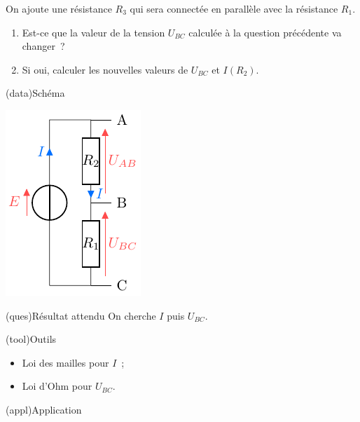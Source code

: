 \documentclass[../../main/main.tex]{subfiles}
\begin{document}
{On ajoute une résistance $R_3$ qui sera connectée en parallèle avec la
résistance $R_1$.
\begin{enumerate}[resume]
  \item Est-ce que la valeur de la tension $U_{BC}$ calculée à la question
        précédente va changer~?
  \item Si oui, calculer les nouvelles valeurs de $U_{BC}$ et $I(R_2)$.
\end{enumerate}
}{
\begin{tcbraster}[raster columns=3, raster equal height=rows]
    \begin{tcb}(data){Schéma}
        \begin{center}
            \includegraphics{divtens}
        \end{center}
    \end{tcb}
    \begin{tcolorbox}[blankest, raster multicolumn=1, space to=\myspace]
        \begin{tcbraster}[raster columns=1]
            \begin{tcb}(ques){Résultat attendu}
                On cherche $I$ puis $U_{BC}$.
            \end{tcb}
            \begin{tcb}[add to natural height=\myspace](tool){Outils}
                \begin{itemize}[leftmargin=10pt]
                    \item Loi des mailles pour $I$~;
                    \item Loi d'Ohm pour $U_{BC}$.
                \end{itemize}
            \end{tcb}
        \end{tcbraster}
    \end{tcolorbox}
    \begin{tcb}(appl){Application}

\end{tcb}
\end{tcbraster}}
\end{document}
